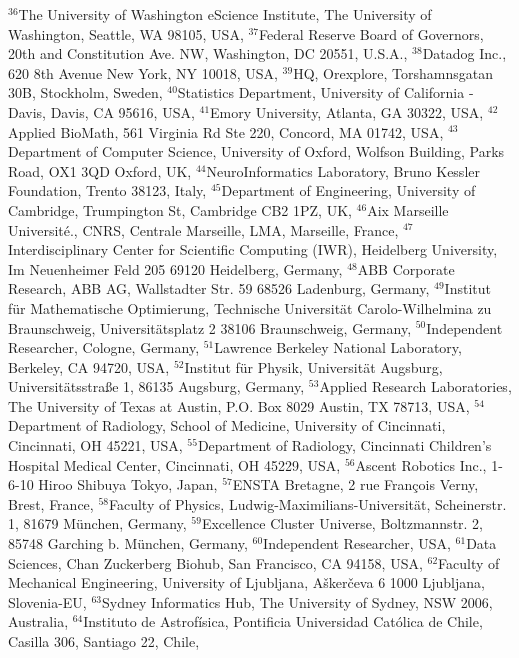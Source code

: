 $^{36}$The University of Washington eScience Institute, The University of Washington, Seattle, WA 98105, USA, 
$^{37}$Federal Reserve Board of Governors,  20th and Constitution Ave. NW, Washington, DC 20551, U.S.A., 
$^{38}$Datadog Inc., 620 8th Avenue New York, NY 10018, USA, 
$^{39}$HQ, Orexplore, Torshamnsgatan 30B, Stockholm, Sweden, 
$^{40}$Statistics Department, University of California - Davis, Davis, CA 95616, USA, 
$^{41}$Emory University, Atlanta, GA 30322, USA, 
$^{42}$Applied BioMath, 561 Virginia Rd Ste 220, Concord, MA 01742, USA, 
$^{43}$Department of Computer Science, University of Oxford, Wolfson Building, Parks Road, OX1 3QD Oxford, UK, 
$^{44}$NeuroInformatics Laboratory, Bruno Kessler Foundation, Trento 38123, Italy, 
$^{45}$Department of Engineering, University of Cambridge, Trumpington St, Cambridge CB2 1PZ, UK, 
$^{46}$Aix Marseille Universit\'e., CNRS, Centrale Marseille, LMA, Marseille, France, 
$^{47}$Interdisciplinary Center for Scientific Computing (IWR), Heidelberg University, Im Neuenheimer Feld 205 69120 Heidelberg, Germany, 
$^{48}$ABB Corporate Research, ABB AG, Wallstadter Str. 59 68526 Ladenburg, Germany, 
$^{49}$Institut f\"ur Mathematische Optimierung, Technische Universit\"at Carolo-Wilhelmina zu Braunschweig, Universit\"atsplatz 2 38106 Braunschweig, Germany, 
$^{50}$Independent Researcher, Cologne, Germany, 
$^{51}$Lawrence Berkeley National Laboratory, Berkeley, CA 94720, USA, 
$^{52}$Institut f{\"u}r Physik, Universit{\"a}t Augsburg, Universit{\"a}tsstra{\ss}e 1, 86135 Augsburg, Germany, 
$^{53}$Applied Research Laboratories, The University of Texas at Austin, P.O. Box 8029 Austin, TX 78713, USA, 
$^{54}$Department of Radiology, School of Medicine, University of Cincinnati, Cincinnati, OH 45221, USA, 
$^{55}$Department of Radiology, Cincinnati Children's Hospital Medical Center, Cincinnati, OH 45229, USA, 
$^{56}$Ascent Robotics Inc., 1-6-10 Hiroo Shibuya Tokyo, Japan, 
$^{57}$ENSTA Bretagne, 2 rue François Verny, Brest, France, 
$^{58}$Faculty of Physics, Ludwig-Maximilians-Universit\"at, Scheinerstr. 1, 81679 M\"unchen, Germany, 
$^{59}$Excellence Cluster Universe, Boltzmannstr. 2, 85748 Garching b. M\"unchen, Germany, 
$^{60}$Independent Researcher, USA, 
$^{61}$Data Sciences, Chan Zuckerberg Biohub, San Francisco, CA 94158, USA, 
$^{62}$Faculty of Mechanical Engineering, University of Ljubljana, A\v{s}ker\v{c}eva 6 1000 Ljubljana, Slovenia-EU, 
$^{63}$Sydney Informatics Hub, The University of Sydney, NSW 2006, Australia, 
$^{64}$Instituto de Astrof\'{i}sica, Pontificia Universidad Cat\'{o}lica de Chile, Casilla 306, Santiago 22, Chile, 
